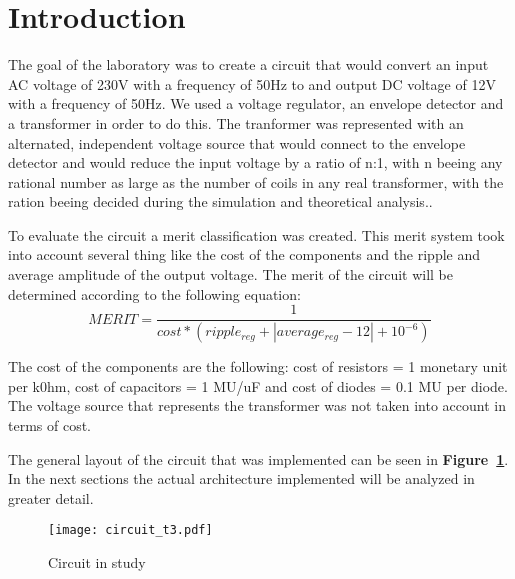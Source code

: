 \section{Introduction}
\label{sec:introduction}


\par The goal of the laboratory was to create a circuit that would convert an input AC voltage of 230V with a frequency of 50Hz to and output DC voltage of 12V with a frequency of 50Hz. We used a voltage regulator, an envelope detector and a transformer in order to do this. The tranformer was represented with an alternated, independent voltage source that would connect to the envelope detector and would reduce the input voltage by a ratio of n:1, with n beeing any rational number as large as the number of coils in any real transformer, with the ration beeing decided during the simulation and theoretical analysis..\par
To evaluate the circuit a merit classification was created. This merit system took into account several thing like the cost of the components and the ripple and average amplitude of the output voltage. The merit of the circuit will be determined according to the following equation: 
\begin {equation}
	 MERIT = \frac{1}{cost*(ripple_{reg} + |average_{reg} - 12| + 10^{-6})}   	
	\label{eq:i1}
\end{equation}

The cost of the components are the following: cost of resistors = 1 monetary unit per k0hm, cost of capacitors = 1 MU/uF and cost of diodes = 0.1 MU per diode. The voltage source that represents the transformer was not taken into account in terms of cost.
 
The general layout of the circuit that was implemented can be seen in \textbf{Figure~\ref{fig:circuit_t3}}. In the next sections the actual architecture implemented will be analyzed in greater detail.\par
\begin{figure}[h] \centering
\texttt{[image: circuit\_t3.pdf]}
\vspace{-6cm}
\caption{Circuit in study}
\label{fig:circuit_t3}
\end{figure}


